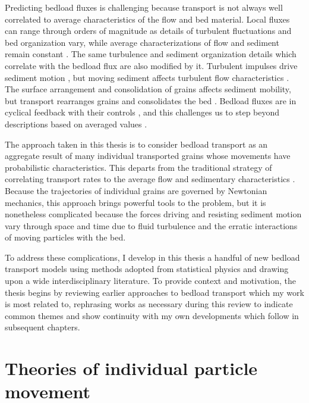 Predicting bedload fluxes is challenging because transport is not always well correlated to average characteristics of the flow and bed material. 
Local fluxes can range through orders of magnitude as details of turbulent fluctuations and bed organization vary, while average characterizations of flow and sediment remain constant \citep{Sumer2003, Charru2004, Hassan2008, Venditti2017}.
The same turbulence and sediment organization details which correlate with the bedload flux are also modified by it.
Turbulent impulses drive sediment motion \citep{Valyrakis2010, Celik2014, Amir2014, Shih2017}, but moving sediment affects turbulent flow characteristics \citep{Singh2010, Santos2014, Liu2016}. The surface arrangement and consolidation of grains \citep{Miller1966,Paintal1971,Dwivedi2012} affects sediment mobility, but transport rearranges grains and consolidates the bed \citep{Kirchener1990, Charru2004, Allen2018, Masteller2019, Pretzlav2020}.
Bedload fluxes are in cyclical feedback with their controls \citep{Jerolmack2005}, and this challenges us to step beyond descriptions based on averaged values \citep{Ancey2020b}.

The approach taken in this thesis is to consider bedload transport as an aggregate result of many individual transported grains whose movements have probabilistic characteristics.
This departs from the traditional strategy of correlating transport rates to the average flow and sedimentary characteristics \citep{MeyerPeter1948, Parker1990, Wilcock2001}.
Because the trajectories of individual grains are governed by Newtonian mechanics, this approach brings powerful tools to the problem, but it is nonetheless complicated because the forces driving and resisting sediment motion vary through space and time due to fluid turbulence and the erratic interactions of moving particles with the bed.


To address these complications, I develop in this thesis a handful of new bedload transport models using methods adopted from statistical physics and drawing upon a wide interdisciplinary literature.
To provide context and motivation, the thesis begins by reviewing earlier approaches to bedload transport which my work is most related to, rephrasing works as necessary during this review to indicate common themes and show continuity with my own developments which follow in subsequent chapters.

\section{Theories of individual particle movement}


